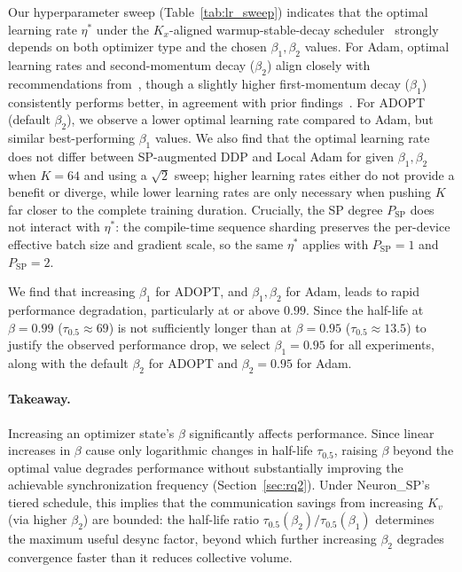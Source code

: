 \documentclass{article}
\begin{document}
Our hyperparameter sweep (Table~\ref{tab:lr_sweep}) indicates that the optimal learning rate $\eta^*$ under the $K_x$-aligned warmup-stable-decay scheduler~\citep{hagele2024scaling} strongly depends on both optimizer type and the chosen $\beta_1, \beta_2$ values. For Adam, optimal learning rates and second-momentum decay ($\beta_2$) align closely with recommendations from~\citet{allal2025smollm2}, though a slightly higher first-momentum decay ($\beta_1$) consistently performs better, in agreement with prior findings~\citep{zhang2025critical}. For ADOPT (default $\beta_2$), we observe a lower optimal learning rate compared to Adam, but similar best-performing $\beta_1$ values. We also find that the optimal learning rate does not differ between SP-augmented DDP and Local Adam for given $\beta_1, \beta_2$ when $K = 64$ and using a $\sqrt{2}$ sweep; higher learning rates either do not provide a benefit or diverge, while lower learning rates are only necessary when pushing $K$ far closer to the complete training duration. Crucially, the SP degree $P_{\text{SP}}$ does not interact with $\eta^*$: the compile-time sequence sharding preserves the per-device effective batch size and gradient scale, so the same $\eta^*$ applies with $P_{\text{SP}} = 1$ and $P_{\text{SP}} = 2$.

We find that increasing $\beta_1$ for ADOPT, and $\beta_1, \beta_2$ for Adam, leads to rapid performance degradation, particularly at or above $0.99$. Since the half-life at $\beta = 0.99$ ($\tau_{0.5} \approx 69$) is not sufficiently longer than at $\beta = 0.95$ ($\tau_{0.5} \approx 13.5$) to justify the observed performance drop, we select $\beta_1 = 0.95$ for all experiments, along with the default $\beta_2$ for ADOPT and $\beta_2 = 0.95$ for Adam.

\paragraph{Takeaway.} Increasing an optimizer state's $\beta$ significantly affects performance. Since linear increases in $\beta$ cause only logarithmic changes in half-life $\tau_{0.5}$, raising $\beta$ beyond the optimal value degrades performance without substantially improving the achievable synchronization frequency (Section~\ref{sec:rq2}). Under Neuron\_SP's tiered schedule, this implies that the communication savings from increasing $K_v$ (via higher $\beta_2$) are bounded: the half-life ratio $\tau_{0.5}(\beta_2) / \tau_{0.5}(\beta_1)$ determines the maximum useful desync factor, beyond which further increasing $\beta_2$ degrades convergence faster than it reduces collective volume.
\end{document}
